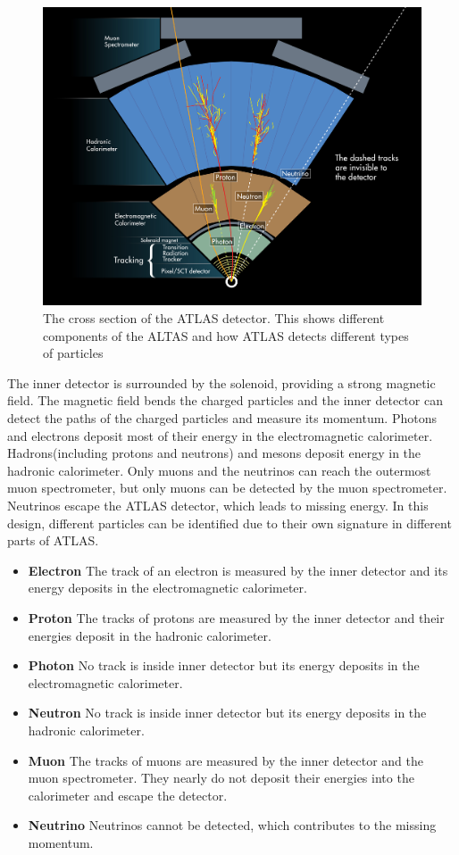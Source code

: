 \begin{figure}
\centering
\includegraphics[width=\textwidth]{data/photo/detector/ATLAS_particles.jpg}
\caption{The cross section of the ATLAS detector. This shows different components of the ALTAS and how ATLAS detects different types of particles \cite{ATLAS_particles}}
\label{fig:ATLAS_particles}
\end{figure}
The inner detector is surrounded by the solenoid, providing a strong magnetic field.
The magnetic field bends the charged particles and the inner detector can detect the paths of the charged particles and measure its momentum.
Photons and electrons deposit most of their energy in the electromagnetic calorimeter.
Hadrons(including protons and neutrons) and mesons deposit energy in the hadronic calorimeter.
Only muons and the neutrinos can reach the outermost muon spectrometer, but only muons can be detected by the muon spectrometer.
Neutrinos escape the ATLAS detector, which leads to missing energy.
In this design, different particles can be identified due to their own signature in different parts of ATLAS.

\begin{itemize}
\item \textbf{Electron} The track of an electron is measured by the inner detector and its energy deposits in the electromagnetic calorimeter.
\item \textbf{Proton} The tracks of protons are measured by the inner detector and their energies deposit in the hadronic calorimeter.
\item \textbf{Photon} No track is inside inner detector but its energy deposits in the electromagnetic calorimeter.
\item \textbf{Neutron} No track is inside inner detector but its energy deposits in the hadronic calorimeter.
\item \textbf{Muon} The tracks of muons are measured by the inner detector and the muon spectrometer. They nearly do not deposit their energies into the calorimeter and escape the detector.
\item \textbf{Neutrino} Neutrinos cannot be detected, which contributes to the missing momentum.
\end{itemize}

